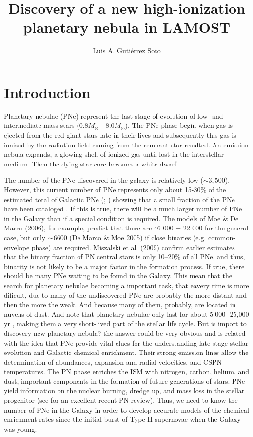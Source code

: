 \documentclass[twocolumn]{article}
\title{Discovery of a new high-ionization planetary nebula in LAMOST}
\author{Luis A. Gutiérrez Soto     
}
\newcommand\msol{M_\odot}
\begin{document}
\maketitle

\section{Introduction}
\label{sec:intro}

Planetary nebulae (PNe) represent the last stage of evolution of low- and intermediate-mass stars
(0.8$\msol$ - 8.0$\msol$). The PNe phase begin when gas is ejected from the red giant stars late
in their lives and subsequently this gas is ionized by the radiation field coming from the remnant
star resulted. An emission nebula expands, a glowing shell of ionized gas until lost in the
interstellar medium. Then the dying star core becomes a white dwarf.

The number of the PNe discovered in the galaxy is relatively low (\(\sim 3,500\)). However,
this current number of PNe represents only about 15-30\% of the estimated
total of Galactic PNe (\citealp{Frew:2008}; \citealp{Jacoby:2010}) showing that a small fraction
of the PNe have been cataloged \citep{Frew:2017}. If this is true, there will be a much larger
number of PNe in the Galaxy than if a special condition
is required. The models of Moe & De Marco (2006), for
example, predict that there are 46 000 ± 22 000 for the general case,
but only ∼6600 (De Marco & Moe 2005) if
close binaries (e.g. common-envelope phase) are required.
Miszalski et al. (2009) confirm earlier estimates that the
binary fraction of PN central stars is only 10–20\% of all
PNe, and thus, binarity is not likely to be a major factor in
the formation process. If true, there should be many PNe
waiting to be found in the Galaxy. This mean that the search for planetary nebulae
becoming a important task, that eavery time is more dificult, due to many of
the undiscovered PNe are probably
the more distant and then the more the weak. And because many of them, probably, are located
in nuvens of dust. And note that planetary nebulae only last for about 5,000-
25,000 yr \citep{Badenes:2015}, making them a very short-lived part of the stellar life cycle.
But is import to discovery new planetary nebula? the answer could be very obvious and is
related with the idea that PNe provide vital clues for the understanding late-stage stellar
evolution and Galactic chemical enrichment. Their strong emission lines allow the determination
of abundances, expansion and radial velocities, and
CSPN temperatures. The PN phase
enriches the ISM with nitrogen, carbon, helium, and dust,
important components in the formation of future generations
of stars. PNe yield information on the nuclear
burning, dredge up, and mass loss in the stellar progenitor
(see \citealp{Kwitter:2022} for an excellent recent PN
review). Thus, we need to know the number of PNe in
the Galaxy in order to develop accurate models of the
chemical enrichment rates since the initial burst of Type II
supernovae when the Galaxy was young.
\end{document}
